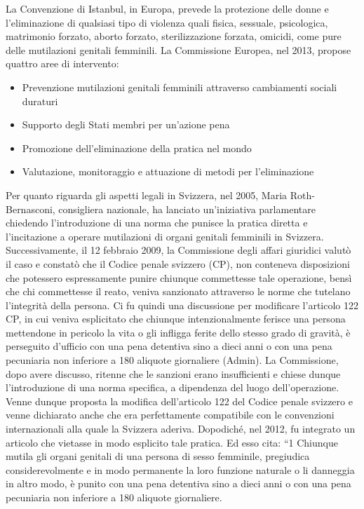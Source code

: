 La Convenzione di Istanbul, in Europa, prevede la protezione delle donne e l’eliminazione di qualsiasi tipo di violenza quali fisica, sessuale, psicologica, matrimonio forzato, aborto forzato, sterilizzazione forzata, omicidi, come pure delle mutilazioni genitali femminili. 
La Commissione Europea, nel 2013, propose quattro aree di intervento:
\begin{itemize}
\item{Prevenzione mutilazioni genitali femminili attraverso cambiamenti sociali duraturi}
\item{Supporto degli Stati membri per un’azione pena}
\item{Promozione dell’eliminazione della pratica nel mondo}
\item{Valutazione, monitoraggio e attuazione di metodi per l’eliminazione}
\end{itemize}
Per quanto riguarda gli aspetti legali in Svizzera, nel 2005, Maria Roth-Bernasconi, consigliera nazionale, ha lanciato un’iniziativa parlamentare chiedendo l’introduzione di una norma che punisce la pratica diretta e l’incitazione a operare mutilazioni di organi genitali femminili in Svizzera. Successivamente, il 12 febbraio 2009, la Commissione degli affari giuridici valutò il caso e constatò che il Codice penale svizzero (CP), non conteneva disposizioni che potessero espressamente punire chiunque commettesse tale operazione, bensì che chi commettesse il reato, veniva sanzionato attraverso le norme che tutelano l’integrità della persona. Ci fu quindi una discussione per modificare l’articolo 122 CP, in cui veniva esplicitato che chiunque intenzionalmente ferisce una persona mettendone in pericolo la vita o gli infligga ferite dello stesso grado di gravità, è perseguito d’ufficio con una pena detentiva sino a dieci anni o con una pena pecuniaria non inferiore a 180 aliquote giornaliere (Admin). La Commissione, dopo avere discusso, ritenne che le sanzioni erano insufficienti e chiese dunque l’introduzione di una norma specifica, a dipendenza del luogo dell’operazione. Venne dunque proposta la modifica dell’articolo 122 del Codice penale svizzero e venne dichiarato anche che era perfettamente compatibile con le convenzioni internazionali alla quale la Svizzera aderiva. 
Dopodiché, nel 2012, fu integrato un articolo che vietasse in modo esplicito tale pratica. Ed esso cita: 
“1 Chiunque mutila gli organi genitali di una persona di sesso femminile, pregiudica considerevolmente e in modo permanente la loro funzione naturale o li danneggia in altro modo, è punito con una pena detentiva sino a dieci anni o con una pena pecuniaria non inferiore a 180 aliquote giornaliere. 
